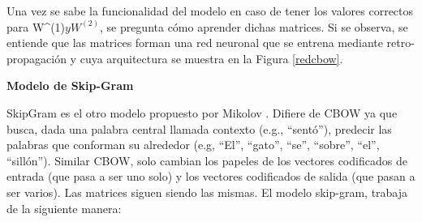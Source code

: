
Una vez se sabe la funcionalidad del modelo en caso de tener los valores correctos para W^{(1)}$ y W^{(2)}$, se pregunta cómo aprender dichas matrices. Si se observa, se entiende que las matrices forman una red neuronal que se entrena mediante retro-propagación y cuya arquitectura se muestra en la Figura  \ref{redcbow}. 


\textbf{Modelo de Skip-Gram}

SkipGram es el otro modelo propuesto por Mikolov \cite{mikolov2013efficient}. Difiere de CBOW ya que busca, dada una palabra central llamada contexto (e.g., “sentó”), predecir las palabras que conforman su alrededor (e.g, “El”, “gato”, “se”, “sobre”, “el”, “sillón”).
 Similar CBOW, solo cambian los papeles de los vectores codificados de entrada (que pasa a ser uno solo) y los vectores codificados de salida (que pasan a ser varios)\cite{goldberg2014word2vec}.
Las matrices siguen siendo las mismas. El modelo skip-gram, trabaja de la siguiente manera:

